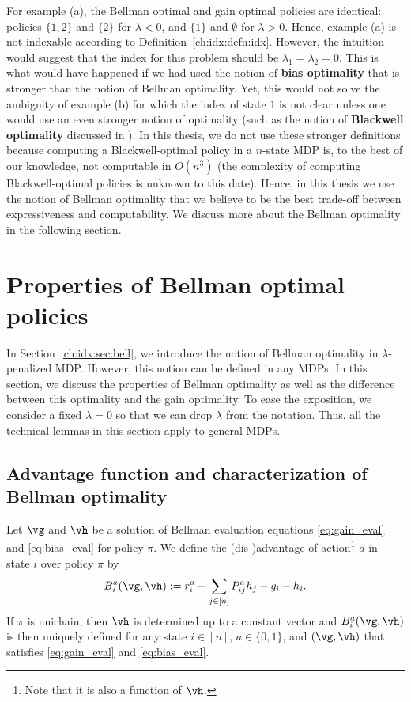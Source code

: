 For example (a), the Bellman optimal and gain optimal policies are identical: policies $\{1,2\}$ and $\{2\}$ for $\lambda<0$, and $\{1\}$ and $\emptyset$ for $\lambda>0$.
Hence, example (a) is not indexable according to Definition~\ref{ch:idx:defn:idx}.
However, the intuition would suggest that the index for this problem should be $\lambda_1=\lambda_2=0$. This is what would have happened if we had used the notion of \textbf{bias optimality} that is stronger than the notion of Bellman optimality. Yet, this would not solve the ambiguity of example (b) for which the index of state $1$ is not clear unless one would use an even  stronger notion of optimality (such as the notion of \textbf{Blackwell optimality} discussed in \cite[Chapter~10]{puterman2014markov}). In this thesis, we do not use these stronger definitions because computing a Blackwell-optimal policy in a $n$-state MDP is, to the best of our knowledge, not computable in $O(n^3)$ (the complexity of computing Blackwell-optimal policies is unknown to this date). Hence, in this thesis we use the notion of Bellman optimality that we believe to be the best trade-off between expressiveness and computability. We discuss more about the Bellman optimality in the following section.

\section{Properties of Bellman optimal policies}
\label{ch:idx:sec:prop_bell}

In Section~\ref{ch:idx:sec:bell}, we introduce the notion of Bellman optimality in $\lambda$-penalized MDP.
However, this notion can be defined in any MDPs.
In this section, we discuss the properties of Bellman optimality as well as the difference between this optimality and the gain optimality.
To ease the exposition, we consider a fixed $\lambda=0$ so that we can drop $\lambda$ from the notation.
Thus, all the technical lemmas in this section apply to general MDPs.

\subsection{Advantage function and characterization of Bellman optimality}

Let $\vg$ and $\vh$ be a solution of Bellman evaluation equations \eqref{eq:gain_eval} and \eqref{eq:bias_eval} for policy $\pi$.
We define the (dis-)advantage of action\footnote{Note that it is also a function of $\vh$.} $a$ in state $i$ over policy $\pi$ by
\begin{equation}
    \label{ch:idx:eq:advan}
    B^a_i(\vg,\vh) := r^a_i +\sum_{j\in[n]}P^a_{ij}h_j -g_i -h_i.
\end{equation}
If $\pi$ is unichain, then $\vh$ is determined up to a constant vector and $B^a_i(\vg,\vh)$ is then uniquely defined for any state $i\in[n]$, $a\in\{0,1\}$, and $(\vg,\vh)$ that satisfies \eqref{eq:gain_eval} and \eqref{eq:bias_eval}.

